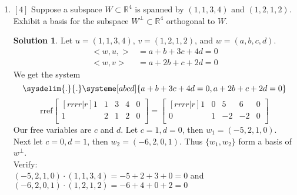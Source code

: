 \documentclass[12pt]{article}
\theoremstyle{definition}
\newtheorem*{solution}{Solution} %
\theoremstyle{plain}
\begin{document}
\begin{enumerate}[wide, labelwidth=!, labelindent=0pt]
\item $[4]$ Suppose a subspace $W\subset\mathbb{R}^4$ is spanned by $(1,1,3,4)$ and $(1,2,1,2)$. Exhibit a basis for the subspace $W^\perp\subset\mathbb{R}^4$ orthogonal to $W$.
	\begin{solution}
	Let $u=(1,1,3,4)$, $v=(1,2,1,2)$, and $w=(a,b,c,d)$.
	\begin{align*}
	<w,u,> &= a+b+3c+4d =0\\
	<w,v>  &= a+2b+c+2d = 0
	\end{align*}
	We get the system
	\[ \sysdelim{.}{.}\systeme[abcd]{a+b+3c+4d=0,a+2b+c+2d=0} \]
	\[ \mathrm{rref}\begin{bmatrix}[rrrr|r]1&1&3&4&0\\1&2&1&2&0\\\end{bmatrix}=\begin{bmatrix}[rrrr|r]1&0&5&6&0\\0&1&-2&-2&0\\\end{bmatrix} \]
	Our free variables are $c$ and $d$. Let $c=1,d=0$, then $w_1=(-5,2,1,0)$. Next let $c=0,d=1$, then $w_2=(-6,2,0,1)$. Thus $\{w_1,w_2\}$ form a basis of $w^\perp$.\\
	Verify:\\
	$(-5,2,1,0)\cdot (1,1,3,4) = -5+2+3+0 = 0$ and $(-6,2,0,1)\cdot (1,2,1,2) = -6+4+0+2 = 0$
	\end{solution}
\end{enumerate}
\end{document}
